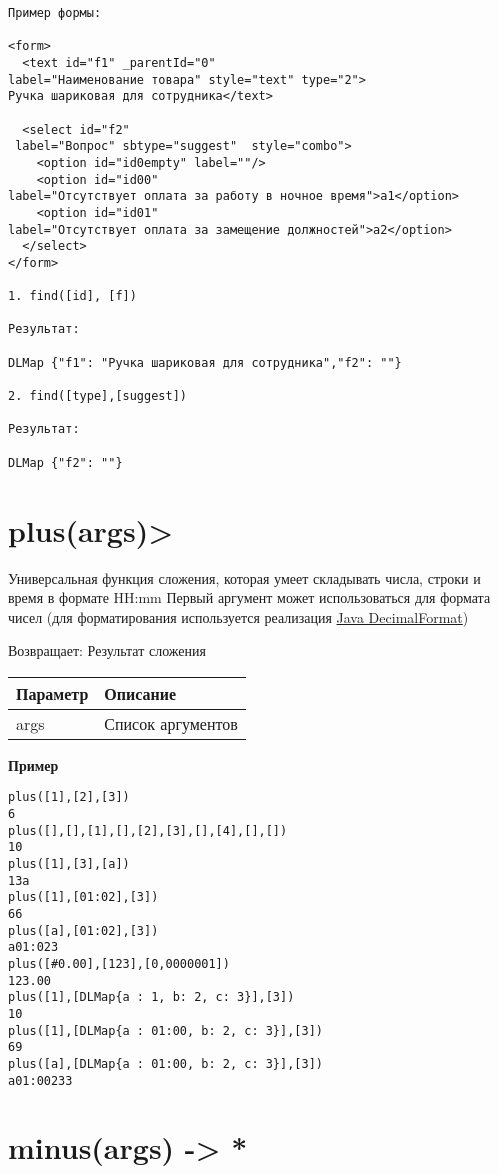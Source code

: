 \begin{verbatim}
Пример формы:

<form>
  <text id="f1" _parentId="0" 
label="Наименование товара" style="text" type="2">
Ручка шариковая для сотрудника</text>

  <select id="f2"
 label="Вопрос" sbtype="suggest"  style="combo">
    <option id="id0empty" label=""/>
    <option id="id00" 
label="Отсутствует оплата за работу в ночное время">a1</option>
    <option id="id01" 
label="Отсутствует оплата за замещение должностей">a2</option>
  </select>
</form>

1. find([id], [f])

Результат:

DLMap {"f1": "Ручка шариковая для сотрудника","f2": ""}

2. find([type],[suggest])

Результат:

DLMap {"f2": ""}
\end{verbatim}

\hypertarget{plusargs}{%
\section{plus(args)>}\label{plusargs}}

Универсальная функция сложения, которая умеет складывать числа, строки и
время в формате HH:mm Первый аргумент может использоваться
для формата чисел (для форматирования используется реализация
\href{https://docs.oracle.com/javase/7/docs/api/java/text/DecimalFormat.html}{Java
DecimalFormat})

Возвращает: Результат сложения

\begin{longtable}[]{@{}ll@{}}
\toprule
Параметр & Описание\tabularnewline
\midrule
\endhead
args & Список аргументов\tabularnewline
\bottomrule
\end{longtable}

\textbf{Пример}

\begin{verbatim}
plus([1],[2],[3])
6
plus([],[],[1],[],[2],[3],[],[4],[],[])
10
plus([1],[3],[a])
13a
plus([1],[01:02],[3])
66
plus([a],[01:02],[3])
a01:023
plus([#0.00],[123],[0,0000001])
123.00
plus([1],[DLMap{a : 1, b: 2, c: 3}],[3])
10
plus([1],[DLMap{a : 01:00, b: 2, c: 3}],[3])
69
plus([a],[DLMap{a : 01:00, b: 2, c: 3}],[3])
a01:00233
\end{verbatim}

\hypertarget{minusargs}{%
\section{minus(args) -> *}\label{minusargs}}

